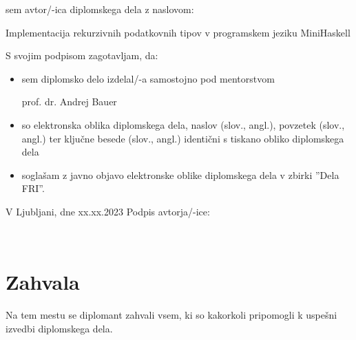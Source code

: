 \documentclass[12pt,a4paper,openany]{book}
\begin{document}
\vspace{1cm}
sem avtor/-ica diplomskega dela z naslovom:
   
\vspace{0.5cm}
Implementacija rekurzivnih podatkovnih tipov v programskem jeziku MiniHaskell

\vspace{1.5cm}
S svojim podpisom zagotavljam, da:
\begin{itemize}
	\item sem diplomsko delo izdelal/-a samostojno pod mentorstvom 
	
	prof. dr. Andrej Bauer
	
	\item	so elektronska oblika diplomskega dela, naslov (slov., angl.), povzetek (slov., angl.) ter ključne besede (slov., 			angl.) identični s tiskano obliko diplomskega dela
	\item soglašam z javno objavo elektronske oblike diplomskega dela v zbirki ''Dela FRI''.
\end{itemize}

\vspace{1cm}
V Ljubljani, dne xx.xx.2023 \hspace{1cm} Podpis avtorja/-ice:

\newpage 


\ \thispagestyle{empty}

\newpage



\chapter*{Zahvala}

\thispagestyle{empty}

Na tem mestu se diplomant zahvali vsem, ki so kakorkoli pripomogli k uspešni izvedbi diplomskega dela.


\newpage


\ \thispagestyle{empty}

\newpage

\end{document}

